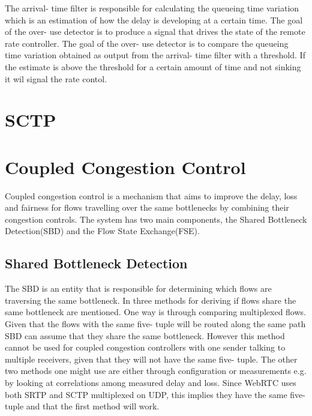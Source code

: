 \documentclass[UKenglish]{ifimaster}  %
\begin{document}
The arrival- time filter is responsible for calculating the queueing time variation which is an estimation of how the delay is developing at a certain time.
The goal of the over- use detector is to produce a signal that drives the state of the remote rate controller. 
The goal of the over- use detector is to compare the queueing time variation obtained as output from the arrival- time filter with a threshold. If the estimate is above the threshold for a certain amount of time and not sinking it wil signal the rate contol.

\section{SCTP}
\section{Coupled Congestion Control}
Coupled congestion control \cite{rfc8699} is a mechanism that aims to improve the delay, loss and fairness for flows travelling over the same bottlenecks by combining their congestion controls. 
The system has two main components, the Shared Bottleneck Detection(SBD) and the Flow State Exchange(FSE). 
\subsection{Shared Bottleneck Detection}
The SBD is an entity that is responsible for determining which flows are traversing the same bottleneck. 
In \cite{rfc8699} three methods for deriving if flows share the same bottleneck are mentioned.
One way is through comparing multiplexed flows. 
Given that the flows with the same five- tuple will be routed along the same path SBD can assume that they share the same bottleneck. 
However this method cannot be used for coupled congestion controllers with one sender talking to multiple receivers, given that they will not have the same five- tuple. 
The other two methods one might use are either through configuration or measurements e.g. by looking at correlations among measured delay and loss. 
Since WebRTC uses both SRTP and SCTP multiplexed on UDP, this implies they have the same five- tuple and that the first method will work. 
\end{document}
